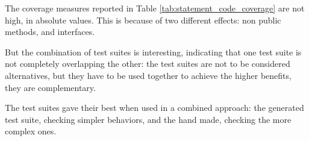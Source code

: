 \documentclass{article} \usepackage{times}
\begin{document}
The coverage measures reported in Table
\ref{tab:statement_code_coverage} are not high, in absolute
values. This is because of two different effects: non public methods,
and interfaces. 

But the combination of test suites is interesting, indicating that one
test suite is not completely overlapping the other: the test suites
are not to be considered alternatives, but they have to be used
together to achieve the higher benefits, they are complementary.

The test suites gave their best when used in a combined approach: the
generated test suite, checking simpler behaviors, and the hand made,
checking the more complex ones.


 

\end{document}
